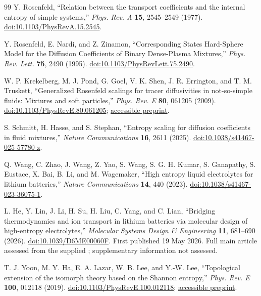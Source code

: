 \documentclass[11pt,a4paper]{article}
\begin{document}
\begin{thebibliography}{99}
\small
{}
Y. Rosenfeld, ``Relation between the transport coefficients and the internal
entropy of simple systems,'' \textit{Phys. Rev. A} \textbf{15}, 2545--2549 (1977).
\href{https://doi.org/10.1103/PhysRevA.15.2545}{doi:10.1103/PhysRevA.15.2545}.

Y. Rosenfeld, E. Nardi, and Z. Zinamon, ``Corresponding States Hard-Sphere Model
for the Diffusion Coefficients of Binary Dense-Plasma Mixtures,''
\textit{Phys. Rev. Lett.} \textbf{75}, 2490 (1995).
\href{https://doi.org/10.1103/PhysRevLett.75.2490}{doi:10.1103/PhysRevLett.75.2490}.

W. P. Krekelberg, M. J. Pond, G. Goel, V. K. Shen, J. R. Errington, and
T. M. Truskett, ``Generalized Rosenfeld scalings for tracer diffusivities in
not-so-simple fluids: Mixtures and soft particles,'' \textit{Phys. Rev. E}
\textbf{80}, 061205 (2009).
\href{https://doi.org/10.1103/PhysRevE.80.061205}{doi:10.1103/PhysRevE.80.061205};
\href{https://arxiv.org/abs/0910.0280}{accessible preprint}.

S. Schmitt, H. Hasse, and S. Stephan, ``Entropy scaling for diffusion
coefficients in fluid mixtures,'' \textit{Nature Communications}
\textbf{16}, 2611 (2025).
\href{https://doi.org/10.1038/s41467-025-57780-z}{doi:10.1038/s41467-025-57780-z}.

Q. Wang, C. Zhao, J. Wang, Z. Yao, S. Wang, S. G. H. Kumar, S. Ganapathy,
S. Eustace, X. Bai, B. Li, and M. Wagemaker,
``High entropy liquid electrolytes for lithium batteries,''
\textit{Nature Communications} \textbf{14}, 440 (2023).
\href{https://doi.org/10.1038/s41467-023-36075-1}{doi:10.1038/s41467-023-36075-1}.

L. He, Y. Lin, J. Li, H. Su, H. Liu, C. Yang, and C. Lian,
``Bridging thermodynamics and ion transport in lithium batteries via molecular
design of high-entropy electrolytes,'' \textit{Molecular Systems Design \&
Engineering} \textbf{11}, 681--690 (2026).
\href{https://doi.org/10.1039/D6ME00060F}{doi:10.1039/D6ME00060F}.
First published 19 May 2026. Full main article assessed from the supplied
; supplementary information not assessed.

T. J. Yoon, M. Y. Ha, E. A. Lazar, W. B. Lee, and Y.-W. Lee,
``Topological extension of the isomorph theory based on the Shannon entropy,''
\textit{Phys. Rev. E} \textbf{100}, 012118 (2019).
\href{https://doi.org/10.1103/PhysRevE.100.012118}{doi:10.1103/PhysRevE.100.012118};
\href{https://arxiv.org/abs/1901.02772}{accessible preprint}.


\end{thebibliography}
\end{document}
